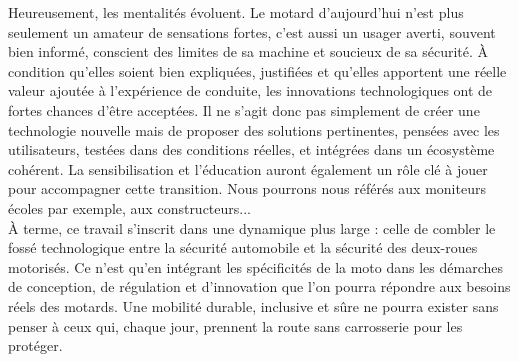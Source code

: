Heureusement, les mentalités évoluent. Le motard d’aujourd’hui n’est plus seulement un amateur de sensations fortes, c’est aussi un usager averti, souvent bien informé, conscient des limites de sa machine et soucieux de sa sécurité. À condition qu’elles soient bien expliquées, justifiées et qu’elles apportent une réelle valeur ajoutée à l’expérience de conduite, les innovations technologiques ont de fortes chances d’être acceptées.
Il ne s’agit donc pas simplement de créer une technologie nouvelle mais de proposer des solutions pertinentes, pensées avec les utilisateurs, testées dans des conditions réelles, et intégrées dans un écosystème cohérent. La sensibilisation et l’éducation auront également un rôle clé à jouer pour accompagner cette transition. Nous pourrons nous référés aux moniteurs écoles par exemple, aux constructeurs...\\
À terme, ce travail s’inscrit dans une dynamique plus large : celle de combler le fossé technologique entre la sécurité automobile et la sécurité des deux-roues motorisés. Ce n’est qu’en intégrant les spécificités de la moto dans les démarches de conception, de régulation et d’innovation que l’on pourra répondre aux besoins réels des motards. Une mobilité durable, inclusive et sûre ne pourra exister sans penser à ceux qui, chaque jour, prennent la route sans carrosserie pour les protéger.